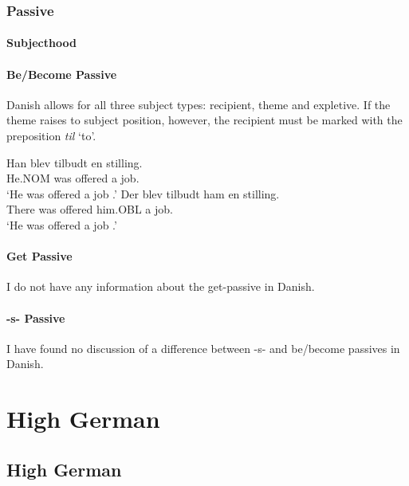 \subsection{Passive}
\subsubsection{Subjecthood}
\subsubsection{Be/Become Passive}
Danish allows for all three subject types: recipient, theme and expletive. If the theme raises to subject position, however, the recipient must be marked with the preposition \emph{til} `to'.
\begin{exe}
\ex
\begin{xlist}
\ex \gll Han blev tilbudt en stilling.\\
He.NOM was offered a job.\\
\trans `He was offered a job \citep{Falk.1990}.'
\ex \gll Der blev tilbudt ham en stilling.\\
There was offered him.OBL a job.\\
\trans `He was offered a job \citep{Falk.1990}.'
\end{xlist}
\end{exe}

\subsubsection{Get Passive}
I do not have any information about the get-passive in Danish.
\subsubsection{-s- Passive}
I have found no discussion of a difference between -s- and be/become passives in Danish.

\chapter{High German}
\section{High German}\label{sec:HGerman}
